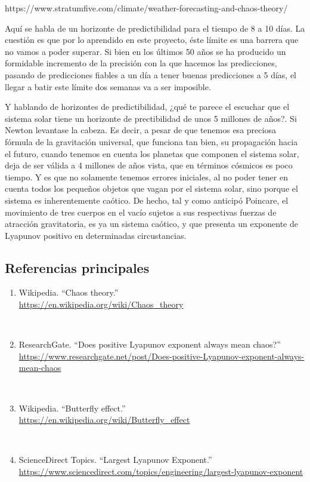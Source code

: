 \documentclass[
  11pt,
  a4paper,
  DIV=11,
  numbers=noendperiod]{scrreprt}
\providecommand{\tightlist}{%
  \setlength{\itemsep}{0pt}\setlength{\parskip}{0pt}}
\begin{document}
https://www.stratumfive.com/climate/weather-forecasting-and-chaos-theory/

Aquí se habla de un horizonte de predictibilidad para el tiempo de 8 a
10 días. La cuestión es que por lo aprendido en este proyecto, éste
límite es una barrera que no vamos a poder superar. Si bien en los
últimos 50 años se ha producido un formidable incremento de la precisión
con la que hacemos las predicciones, pasando de predicciones fiables a
un día a tener buenas predicciones a 5 días, el llegar a batir este
límite dos semanas va a ser imposible.

Y hablando de horizontes de predictibilidad, ¿qué te parece el escuchar
que el sistema solar tiene un horizonte de prectibilidad de unos 5
millones de años?. Si Newton levantase la cabeza. Es decir, a pesar de
que tenemos esa preciosa fórmula de la gravitación universal, que
funciona tan bien, su propagación hacia el futuro, cuando tenemos en
cuenta los planetas que componen el sistema solar, deja de ser válida a
4 millones de años vista, que en términos cósmicos es poco tiempo. Y es
que no solamente tenemos errores iniciales, al no poder tener en cuenta
todos los pequeños objetos que vagan por el sistema solar, sino porque
el sistema es inherentemente caótico. De hecho, tal y como anticipó
Poincare, el movimiento de tres cuerpos en el vacío sujetos a sus
respectivas fuerzas de atracción gravitatoria, es ya un sistema caótico,
y que presenta un exponente de Lyapunov positivo en determinadas
circustancias.

\subsection{Referencias principales}\label{referencias-principales}

\begin{enumerate}
\def\labelenumi{\arabic{enumi}.}
\tightlist
\item
  Wikipedia. ``Chaos theory.''\\
  \url{https://en.wikipedia.org/wiki/Chaos_theory}\strut \\
\item
  ResearchGate. ``Does positive Lyapunov exponent always mean chaos?''\\
  \url{https://www.researchgate.net/post/Does-positive-Lyapunov-exponent-always-mean-chaos}\strut \\
\item
  Wikipedia. ``Butterfly effect.''\\
  \url{https://en.wikipedia.org/wiki/Butterfly_effect}\strut \\
\item
  ScienceDirect Topics. ``Largest Lyapunov Exponent.''\\
  \url{https://www.sciencedirect.com/topics/engineering/largest-lyapunov-exponent}
\end{enumerate}
\end{document}
